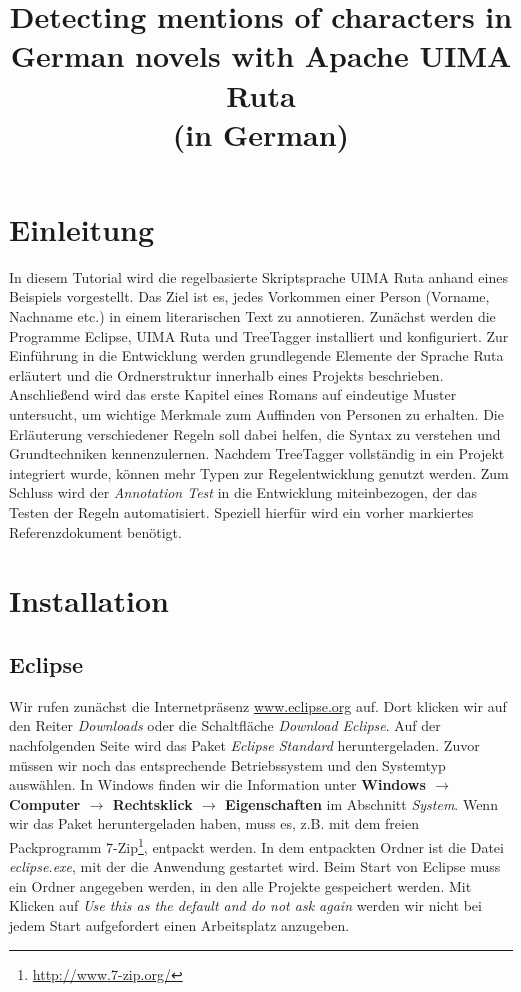 \documentclass{article}
\title{Detecting mentions of characters in German novels with Apache UIMA{\texttrademark} Ruta\\
(in German)
}
\begin{document}
\maketitle


\tableofcontents

\section{Einleitung}

In diesem Tutorial wird die regelbasierte Skriptsprache UIMA Ruta anhand eines Beispiels vorgestellt. Das Ziel ist es, jedes Vorkommen einer Person (Vorname, Nachname etc.) in einem literarischen Text zu annotieren. Zunächst werden die Programme Eclipse, UIMA Ruta und TreeTagger installiert und konfiguriert. Zur Einführung in die Entwicklung werden grundlegende Elemente der Sprache Ruta erläutert und die Ordnerstruktur innerhalb eines Projekts beschrieben. Anschließend wird das erste Kapitel eines Romans auf eindeutige Muster untersucht, um wichtige Merkmale zum Auffinden von Personen zu erhalten. Die Erläuterung verschiedener Regeln soll dabei helfen, die Syntax zu verstehen und Grundtechniken kennenzulernen. Nachdem TreeTagger vollständig in ein Projekt integriert wurde, können mehr Typen zur Regelentwicklung genutzt werden. Zum Schluss wird der \textit{Annotation Test} in die Entwicklung miteinbezogen, der das Testen der Regeln automatisiert. Speziell hierfür wird ein vorher markiertes Referenzdokument benötigt.

\section{Installation}

\subsection{Eclipse}
Wir rufen zunächst die Internetpräsenz \url{www.eclipse.org} auf. Dort klicken wir auf den Reiter \textit{Downloads} oder die Schaltfläche \textit{Download Eclipse}. Auf der nachfolgenden Seite wird das Paket \textit{Eclipse Standard} heruntergeladen. Zuvor müssen wir noch das entsprechende Betriebssystem und den Systemtyp auswählen. In Windows finden wir die Information unter \textbf{Windows $\rightarrow$ Computer $\rightarrow$ Rechts\-klick $\rightarrow$ Eigenschaften} im Abschnitt \textit{System}. Wenn wir das Paket heruntergeladen haben, muss es, z.B. mit dem freien Packprogramm 7-Zip\footnote{\url{http://www.7-zip.org/}}, entpackt werden. In dem entpackten Ordner ist die Datei \textit{eclipse.exe}, mit der die Anwendung gestartet wird. Beim Start von Eclipse muss ein Ordner angegeben werden, in den alle Projekte gespeichert werden. Mit Klicken auf \textit{Use this as the default and do not ask again} werden wir nicht bei jedem Start aufgefordert einen Arbeitsplatz anzugeben.
\end{document}
